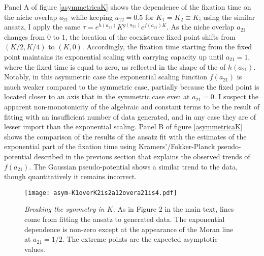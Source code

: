 Panel A of figure \ref{asymmetricaK} shows the dependence of the fixation time on the niche overlap $a_{21}$ while keeping $a_{12}=0.5$ for $K_1=K_2\equiv K$; using the similar ansatz, I apply the same $\tau=e^{h(a_{21})}K^{g(a_{21})}e^{f(a_{21})K}$. 
As the niche overlap $a_{21}$ changes from $0$ to $1$, the location of the coexistence fixed point shifts from $(K/2,K/4)$ to $(K,0)$. 
Accordingly, the fixation time starting from the fixed point maintains its exponential scaling with carrying capacity up until $a_{21}=1$, where the fixed time is equal to zero, as reflected in the shape of the of $h(a_{21})$. 
Notably, in this asymmetric case the exponential scaling function $f(a_{21})$ is much weaker compared to the symmetric case, partially because the fixed point is located closer to an axis that in the symmetric case even at $a_{21}=0$. 
I suspect the apparent non-monotonicity of the algebraic and constant terms to be the result of fitting with an insufficient number of data generated, and in any case they are of lesser import than the exponential scaling. 
Panel B of figure \ref{asymmetricaK} shows the comparison of the results of the ansatz fit with the estimates of the exponential part of the fixation time using Kramers'/Fokker-Planck pseudo-potential described in the previous section that explains the observed trends of $f(a_{21})$. 
The Gaussian pseudo-potential shows a similar trend to the data, though quantitatively it remains incorrect. 

\iffalse
\begin{figure}[ht]
	\centering
	\texttt{[image: asym-K1overK2is2a12overa21is4.pdf]}
	\caption{\emph{Breaking the symmetry in $K$.} As in Figure 2 in the main text, lines come from fitting the ansatz to generated data. The exponential dependence is non-zero except at the appearance of the Moran line at $a_{21}=1/2$. The extreme points are the expected asymptotic values. }
	\label{asymmetricK}
\end{figure}

